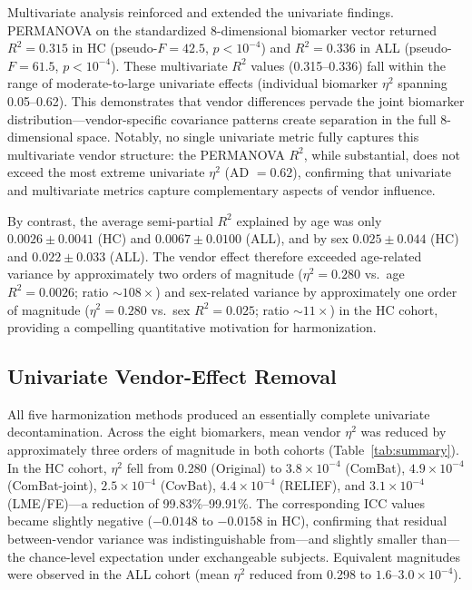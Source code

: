 \documentclass[12pt,a4paper]{article}
\begin{document}
Multivariate analysis reinforced and extended the univariate findings. PERMANOVA on the standardized 8-dimensional biomarker vector returned $R^2 = 0.315$ in HC (pseudo-$F = 42.5$, $p < 10^{-4}$) and $R^2 = 0.336$ in ALL (pseudo-$F = 61.5$, $p < 10^{-4}$). These multivariate $R^2$ values (0.315--0.336) fall within the range of moderate-to-large univariate effects (individual biomarker $\eta^2$ spanning 0.05--0.62). This demonstrates that vendor differences pervade the joint biomarker distribution---vendor-specific covariance patterns create separation in the full 8-dimensional space. Notably, no single univariate metric fully captures this multivariate vendor structure: the PERMANOVA $R^2$, while substantial, does not exceed the most extreme univariate $\eta^2$ (AD $= 0.62$), confirming that univariate and multivariate metrics capture complementary aspects of vendor influence.

By contrast, the average semi-partial $R^2$ explained by age was only $0.0026 \pm 0.0041$ (HC) and $0.0067 \pm 0.0100$ (ALL), and by sex $0.025 \pm 0.044$ (HC) and $0.022 \pm 0.033$ (ALL). The vendor effect therefore exceeded age-related variance by approximately two orders of magnitude ($\eta^2 = 0.280$ vs.\ age $R^2 = 0.0026$; ratio $\sim 108\times$) and sex-related variance by approximately one order of magnitude ($\eta^2 = 0.280$ vs.\ sex $R^2 = 0.025$; ratio $\sim 11\times$) in the HC cohort, providing a compelling quantitative motivation for harmonization.

\subsection{Univariate Vendor-Effect Removal}

All five harmonization methods produced an essentially complete univariate decontamination. Across the eight biomarkers, mean vendor $\eta^2$ was reduced by approximately three orders of magnitude in both cohorts (Table~\ref{tab:summary}). In the HC cohort, $\eta^2$ fell from 0.280 (Original) to $3.8 \times 10^{-4}$ (ComBat), $4.9 \times 10^{-4}$ (ComBat-joint), $2.5 \times 10^{-4}$ (CovBat), $4.4 \times 10^{-4}$ (RELIEF), and $3.1 \times 10^{-4}$ (LME/FE)---a reduction of 99.83\%--99.91\%. The corresponding ICC values became slightly negative ($-0.0148$ to $-0.0158$ in HC), confirming that residual between-vendor variance was indistinguishable from---and slightly smaller than---the chance-level expectation under exchangeable subjects. Equivalent magnitudes were observed in the ALL cohort (mean $\eta^2$ reduced from 0.298 to $1.6$--$3.0 \times 10^{-4}$).
\end{document}
